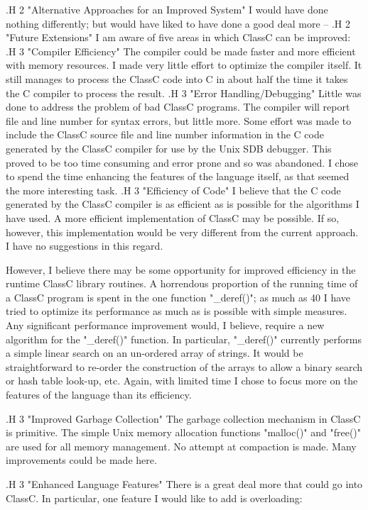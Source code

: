 .H 2 "Alternative Approaches for an Improved System"
I would have done nothing differently; but would have liked to have
done a good deal more --
.H 2 "Future Extensions"
I am aware of five areas in which ClassC can be improved:
.H 3 "Compiler Efficiency"
The compiler could be made faster and more efficient with memory resources.
I made very little effort to optimize the compiler itself.  It still manages
to process the ClassC code into C
in about half the time it takes the C compiler to
process the result.
.H 3 "Error Handling/Debugging"
Little was done to address the problem of bad ClassC programs.  The compiler
will report file and line number for syntax errors, but little more.
Some effort was made to include the ClassC source file and line number
information in the C code generated by the ClassC compiler for use by the
Unix SDB debugger.  This proved to be too time consuming and error prone
and so was abandoned.
I chose to spend the time enhancing the features of the language itself, as
that seemed the more interesting task.
.H 3 "Efficiency of Code"
I believe that the C code generated by the ClassC compiler is as efficient as
is possible for the algorithms I have used.
A more efficient implementation of ClassC may be possible.  If
so, however, this implementation would be very different
from the current approach.  I have no suggestions in this regard.

However, I believe there may be some opportunity for improved efficiency in the
runtime ClassC library routines.  A horrendous proportion of the running time of
a ClassC program is spent in the one function "_deref()"; as much as 40%
I have tried to optimize its performance as much as is possible with simple
measures.  Any significant performance improvement would, I believe, require
a new algorithm for the "_deref()" function.  In particular, "_deref()"
currently performs a simple linear search on an un-ordered array of strings.
It would be straightforward to re-order the construction of the arrays
to allow a binary search or hash table look-up, etc.  Again, with limited
time I chose to focus more on the features of the language than its
efficiency.

.H 3 "Improved Garbage Collection"
The garbage collection mechanism in ClassC is primitive.  The simple
Unix memory allocation functions "malloc()" and "free()" are used for all
memory management.  No attempt at compaction is made.  Many improvements
could be made here.

.H 3 "Enhanced Language Features"
There is a great deal more that could go into ClassC.  In particular,
one feature I would like to add is overloading:

